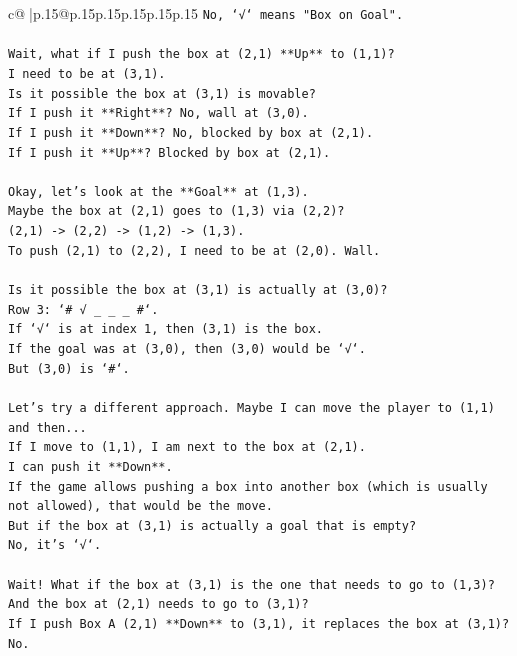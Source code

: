 \documentclass{article}
\begin{document}
{\begin{supertabular}{c@{$\;$}|p{.15\linewidth}@{}p{.15\linewidth}p{.15\linewidth}p{.15\linewidth}p{.15\linewidth}p{.15\linewidth}}
{{{\texttt{No, `√` means "Box on Goal".} \\
\\ 
\texttt{Wait, what if I push the box at (2,1) **Up** to (1,1)?} \\
\texttt{I need to be at (3,1).} \\
\texttt{Is it possible the box at (3,1) is movable?} \\
\texttt{If I push it **Right**? No, wall at (3,0).} \\
\texttt{If I push it **Down**? No, blocked by box at (2,1).} \\
\texttt{If I push it **Up**? Blocked by box at (2,1).} \\
\\ 
\texttt{Okay, let's look at the **Goal** at (1,3).} \\
\texttt{Maybe the box at (2,1) goes to (1,3) via (2,2)?} \\
\texttt{(2,1) {-}> (2,2) {-}> (1,2) {-}> (1,3).} \\
\texttt{To push (2,1) to (2,2), I need to be at (2,0). Wall.} \\
\\ 
\texttt{Is it possible the box at (3,1) is actually at (3,0)?} \\
\texttt{Row 3: `\# √ \_ \_ \_ \#`.} \\
\texttt{If `√` is at index 1, then (3,1) is the box.} \\
\texttt{If the goal was at (3,0), then (3,0) would be `√`.} \\
\texttt{But (3,0) is `\#`.} \\
\\ 
\texttt{Let's try a different approach. Maybe I can move the player to (1,1) and then...} \\
\texttt{If I move to (1,1), I am next to the box at (2,1).} \\
\texttt{I can push it **Down**.} \\
\texttt{If the game allows pushing a box into another box (which is usually not allowed), that would be the move.} \\
\texttt{But if the box at (3,1) is actually a goal that is empty?} \\
\texttt{No, it's `√`.} \\
\\ 
\texttt{Wait! What if the box at (3,1) is the one that needs to go to (1,3)?} \\
\texttt{And the box at (2,1) needs to go to (3,1)?} \\
\texttt{If I push Box A (2,1) **Down** to (3,1), it replaces the box at (3,1)? No.} \\
}}}
\end{supertabular}}
\end{document}
